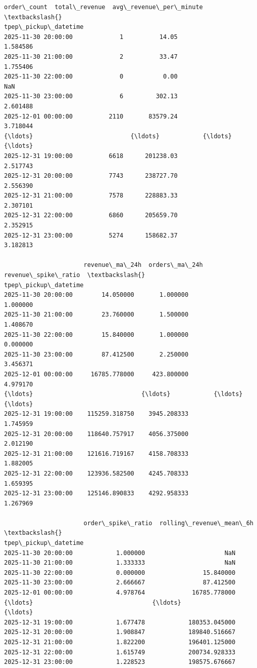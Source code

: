 \documentclass[11pt]{article}
\begin{document}
    \begin{Verbatim}[commandchars=\\\{\}]
                      order\_count  total\_revenue  avg\_revenue\_per\_minute  \textbackslash{}
tpep\_pickup\_datetime
2025-11-30 20:00:00             1          14.05                1.584586
2025-11-30 21:00:00             2          33.47                1.755406
2025-11-30 22:00:00             0           0.00                     NaN
2025-11-30 23:00:00             6         302.13                2.601488
2025-12-01 00:00:00          2110       83579.24                3.718044
{\ldots}                           {\ldots}            {\ldots}                     {\ldots}
2025-12-31 19:00:00          6618      201238.03                2.517743
2025-12-31 20:00:00          7743      238727.70                2.556390
2025-12-31 21:00:00          7578      228883.33                2.307101
2025-12-31 22:00:00          6860      205659.70                2.352915
2025-12-31 23:00:00          5274      158682.37                3.182813

                      revenue\_ma\_24h  orders\_ma\_24h  revenue\_spike\_ratio  \textbackslash{}
tpep\_pickup\_datetime
2025-11-30 20:00:00        14.050000       1.000000             1.000000
2025-11-30 21:00:00        23.760000       1.500000             1.408670
2025-11-30 22:00:00        15.840000       1.000000             0.000000
2025-11-30 23:00:00        87.412500       2.250000             3.456371
2025-12-01 00:00:00     16785.778000     423.800000             4.979170
{\ldots}                              {\ldots}            {\ldots}                  {\ldots}
2025-12-31 19:00:00    115259.318750    3945.208333             1.745959
2025-12-31 20:00:00    118640.757917    4056.375000             2.012190
2025-12-31 21:00:00    121616.719167    4158.708333             1.882005
2025-12-31 22:00:00    123936.582500    4245.708333             1.659395
2025-12-31 23:00:00    125146.890833    4292.958333             1.267969

                      order\_spike\_ratio  rolling\_revenue\_mean\_6h  \textbackslash{}
tpep\_pickup\_datetime
2025-11-30 20:00:00            1.000000                      NaN
2025-11-30 21:00:00            1.333333                      NaN
2025-11-30 22:00:00            0.000000                15.840000
2025-11-30 23:00:00            2.666667                87.412500
2025-12-01 00:00:00            4.978764             16785.778000
{\ldots}                                 {\ldots}                      {\ldots}
2025-12-31 19:00:00            1.677478            180353.045000
2025-12-31 20:00:00            1.908847            189840.516667
2025-12-31 21:00:00            1.822200            196401.125000
2025-12-31 22:00:00            1.615749            200734.928333
2025-12-31 23:00:00            1.228523            198575.676667


\end{Verbatim}
\end{document}
